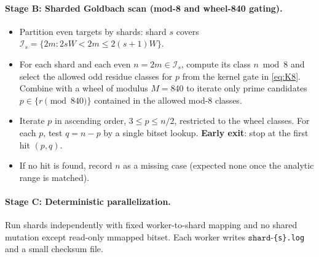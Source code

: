\documentclass[11pt]{article}
\theoremstyle{definition}
\theoremstyle{remark}
\begin{document}
\paragraph{Stage B: Sharded Goldbach scan (mod-8 and wheel-840 gating).}
\begin{itemize}
  \item Partition even targets by shards: shard $s$ covers $\mathcal I_s=\{2m: 2sW<2m\le 2(s{+}1)W\}$.
  \item For each shard and each even $n=2m\in\mathcal I_s$, compute its class $n\bmod 8$ and select the allowed odd residue classes for $p$ from the kernel gate in \eqref{eq:K8}. Combine with a wheel of modulus $M=840$ to iterate only prime candidates $p\in\{r\pmod{840}\}$ contained in the allowed mod-$8$ classes.
  \item Iterate $p$ in ascending order, $3\le p\le n/2$, restricted to the wheel classes. For each $p$, test $q=n-p$ by a single bitset lookup. \textbf{Early exit}: stop at the first hit $(p,q)$.
  \item If no hit is found, record $n$ as a missing case (expected none once the analytic range is matched).
\end{itemize}

\paragraph{Stage C: Deterministic parallelization.} Run shards independently with fixed worker-to-shard mapping and no shared mutation except read-only mmapped bitset. Each worker writes $\texttt{shard-}$\texttt{\{s\}}\texttt{.log} and a small checksum file.
\end{document}
